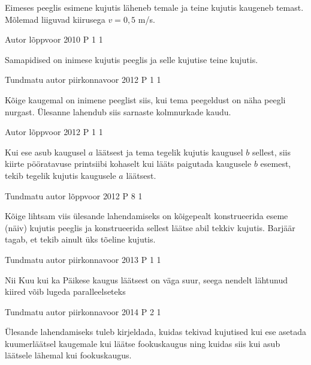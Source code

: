 \documentclass[11pt]{article}
\begin{document}
{{\ifHint
Eimeses peeglis esimene kujutis läheneb temale ja teine kujutis kaugeneb temast. Mõlemad liiguvad kiirusega $v = 0,5$ m/s.
\fi
}


{Autor} %
{lõppvoor} %
{2010} %
{P 1} %
{1} %
{

\ifHint
Samapidised on inimese kujutis peeglis ja selle kujutise teine kujutis.
\fi
}


{Tundmatu autor} %
{piirkonnavoor} %
{2012} %
{P 1} %
{1} %
{

\ifHint
Kõige kaugemal on inimene peeglist siis, kui tema peegeldust on näha peegli nurgast. Ülesanne lahendub siis sarnaste kolmnurkade kaudu.
\fi
}


{Autor} %
{lõppvoor} %
{2012} %
{P 1} %
{1} %
{

\ifHint
Kui ese asub kaugusel $a$ läätsest ja tema tegelik kujutis kaugusel $b$ sellest, siis kiirte pööratavuse printsiibi kohaselt kui lääts paigutada kaugusele $b$ esemest, tekib tegelik kujutis kaugusele $a$ läätsest.
\fi
}

{Tundmatu autor} %
{lõppvoor} %
{2012} %
{P 8} %
{1} %
{

\ifHint
Kõige lihtsam viis ülesande lahendamiseks on kõigepealt konstrueerida eseme (näiv) kujutis peeglis ja konstrueerida sellest läätse abil tekkiv kujutis. Barjäär tagab, et tekib ainult üks tõeline kujutis.
\fi
}


{Tundmatu autor} %
{piirkonnavoor} %
{2013} %
{P 1} %
{1} %
{

\ifHint
Nii Kuu kui ka Päikese kaugus läätsest on väga suur, seega nendelt lähtunud kiired võib lugeda paralleelseteks
\fi
}
 


{Tundmatu autor} %
{piirkonnavoor} %
{2014} %
{P 2} %
{1} %
{

\ifHint
Ülesande lahendamiseks tuleb kirjeldada, kuidas tekivad kujutised kui ese asetada kuumerläätsel kaugemale kui läätse fookuskaugus ning kuidas siis kui asub läätsele lähemal kui fookuskaugus.
\fi
}


}
\end{document}
